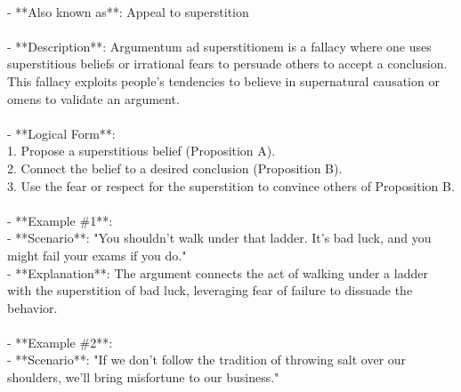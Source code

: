 \documentclass[a4paper,12pt,single,pdftex]{scrbook}
\begin{document}
    
      
    \\

    
      - **Also known as**: Appeal to superstition
    \\

    
      
    \\

    
      - **Description**: Argumentum ad superstitionem is a fallacy where one uses superstitious beliefs or irrational fears to persuade others to accept a conclusion. This fallacy exploits people's tendencies to believe in supernatural causation or omens to validate an argument.
    \\

    
      
    \\

    
      - **Logical Form**:
    \\

    
        1. Propose a superstitious belief (Proposition A).
    \\

    
        2. Connect the belief to a desired conclusion (Proposition B).
    \\

    
        3. Use the fear or respect for the superstition to convince others of Proposition B.
    \\

    
      
    \\

    
      - **Example \#1**:
    \\

    
        - **Scenario**: "You shouldn't walk under that ladder. It's bad luck, and you might fail your exams if you do."
    \\

    
        - **Explanation**: The argument connects the act of walking under a ladder with the superstition of bad luck, leveraging fear of failure to dissuade the behavior.
    \\

    
      
    \\

    
      - **Example \#2**:
    \\

    
        - **Scenario**: "If we don't follow the tradition of throwing salt over our shoulders, we'll bring misfortune to our business."
    \\
\end{document}
